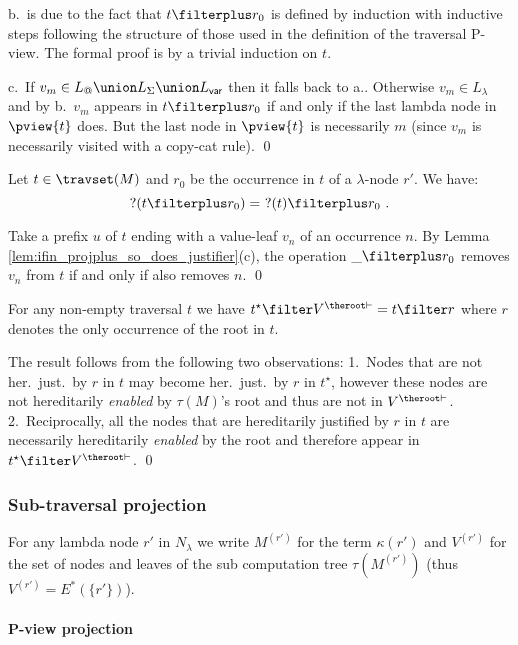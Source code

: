 b.\ is due to the fact that $t\filterplus r_0$ is defined by
induction with inductive steps following the structure of those used
in the definition of the traversal P-view. The formal proof is by a
trivial induction on $t$.

c.\ If $v_m \in L_@ \union L_\Sigma \union L_{\sf var}$ then it
falls back to a.. Otherwise $v_m \in L_\lambda$ and by b.\, $v_m$
appears in $t\filterplus r_0$ if and only if the last lambda node in
$\pview{t}$ does. But the last node in $\pview{t}$ is necessarily
$m$ (since $v_m$ is necessarily visited with a copy-cat rule). \qed
\smallskip


\begin{lemma}
\label{lem:projplus_pendingnode}
 Let $t \in \travset(M)$ and $r_0$ be the occurrence in $t$ of a $\lambda$-node $r'$.
 We have:
  $$?(t\filterplus r_0) =\ ?(t) \filterplus r_0 \ .$$
\end{lemma}
\proof Take a prefix $u$ of $t$ ending with a value-leaf $v_n$ of an
occurrence $n$. By Lemma
\ref{lem:ifin_projplus_so_does_justifier}(c), the operation $\_
\filterplus r_0$ removes $v_n$ from $t$ if and only if also removes
$n$. \qed
\smallskip

\begin{lemma}
\label{lem:he_proj_root_is_hj_proj_r} For any non-empty traversal
$t$ we have  $t^\star\filter V^{\theroot\vdash} = t \filter r$ where
$r$ denotes the only occurrence of the root in $t$.
\end{lemma}
\proof The result follows from the following two observations: 1.\
Nodes that are not her.\ just.\ by $r$ in $t$ may become her.\
just.\ by $r$ in $t^\star$, however these nodes are not hereditarily
\emph{enabled}
 by $\tau(M)$'s root and thus are not in $V^{\theroot\vdash}$.
2.\ Reciprocally, all the nodes that are hereditarily justified by
$r$ in $t$ are necessarily hereditarily \emph{enabled} by the root
and therefore appear in $t^\star \filter V^{\theroot\vdash}$. \qed


\subsubsection{Sub-traversal projection}

For any lambda node $r'$ in $N_\lambda$ we write
$M^{(r')}$ for the term $\kappa(r')$ and $V^{(r')}$ for the set of nodes and leaves of the sub computation tree $\tau(M^{(r')})$ (thus $V^{(r')} = E^*(\{r'\})$).

\paragraph{P-view projection}


